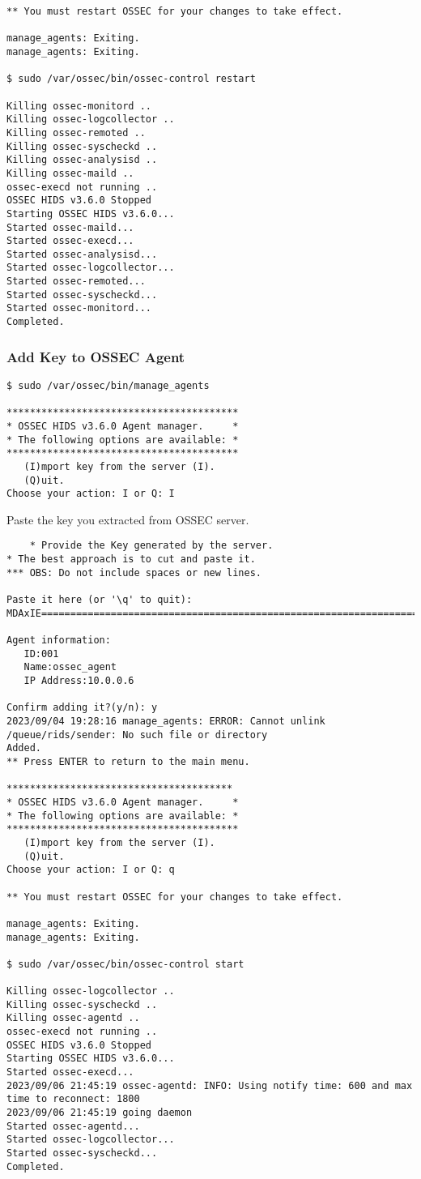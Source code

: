 \documentclass{article}
\begin{document}
\begin{verbatim}
** You must restart OSSEC for your changes to take effect.

manage_agents: Exiting.
manage_agents: Exiting.

$ sudo /var/ossec/bin/ossec-control restart

Killing ossec-monitord ..
Killing ossec-logcollector ..
Killing ossec-remoted ..
Killing ossec-syscheckd ..
Killing ossec-analysisd ..
Killing ossec-maild ..
ossec-execd not running ..
OSSEC HIDS v3.6.0 Stopped
Starting OSSEC HIDS v3.6.0...
Started ossec-maild...
Started ossec-execd...
Started ossec-analysisd...
Started ossec-logcollector...
Started ossec-remoted...
Started ossec-syscheckd...
Started ossec-monitord...
Completed.
\end{verbatim}
\subsubsection{Add Key to OSSEC Agent}
\begin{verbatim}
$ sudo /var/ossec/bin/manage_agents

****************************************
* OSSEC HIDS v3.6.0 Agent manager.     *
* The following options are available: *
****************************************
   (I)mport key from the server (I).
   (Q)uit.
Choose your action: I or Q: I
\end{verbatim}
Paste the key you extracted from OSSEC server.
\begin{verbatim}
    * Provide the Key generated by the server.
* The best approach is to cut and paste it.
*** OBS: Do not include spaces or new lines.

Paste it here (or '\q' to quit): MDAxIE==================================================================================5YjU1MQ==

Agent information:
   ID:001
   Name:ossec_agent
   IP Address:10.0.0.6

Confirm adding it?(y/n): y
2023/09/04 19:28:16 manage_agents: ERROR: Cannot unlink /queue/rids/sender: No such file or directory
Added.
** Press ENTER to return to the main menu.

***************************************
* OSSEC HIDS v3.6.0 Agent manager.     *
* The following options are available: *
****************************************
   (I)mport key from the server (I).
   (Q)uit.
Choose your action: I or Q: q

** You must restart OSSEC for your changes to take effect.

manage_agents: Exiting.
manage_agents: Exiting.

$ sudo /var/ossec/bin/ossec-control start

Killing ossec-logcollector ..
Killing ossec-syscheckd ..
Killing ossec-agentd ..
ossec-execd not running ..
OSSEC HIDS v3.6.0 Stopped
Starting OSSEC HIDS v3.6.0...
Started ossec-execd...
2023/09/06 21:45:19 ossec-agentd: INFO: Using notify time: 600 and max time to reconnect: 1800
2023/09/06 21:45:19 going daemon
Started ossec-agentd...
Started ossec-logcollector...
Started ossec-syscheckd...
Completed.


\end{verbatim}
\end{document}
